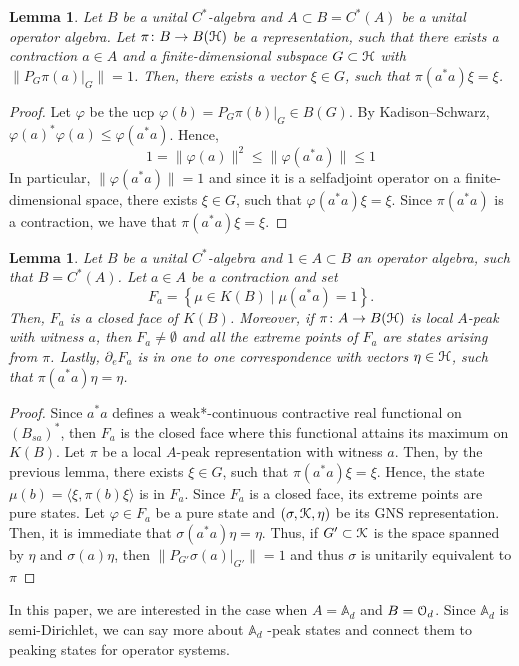 \documentclass{article}
\newtheorem{lem}[thm]{Lemma}
\theoremstyle{definition}
\theoremstyle{remark}
\numberwithin{equation}{section}
\newcommand{\cuntz}{\ensuremath{\cO_d}}
\def\A{\mathbb{A} _d}
\begin{document}
\begin{lem}
Let $B$ be a unital $C^*$-algebra and $A \subset B = C^*(A)$ be a unital operator algebra. Let $\pi \colon B \to B({\mathcal H})$ be a representation, such that there exists a contraction $a \in A$ and a finite-dimensional subspace $G \subset {\mathcal H}$ with $\|P_G \pi(a)|_G\| = 1$. Then, there exists a vector $\xi \in G$, such that $\pi(a^* a) \xi = \xi$.
\end{lem}
\begin{proof}
Let $\varphi$ be the ucp $\varphi(b) = P_G \pi(b)|_G \in B(G)$. By Kadison--Schwarz, $\varphi(a)^* \varphi(a) \leq \varphi(a^* a)$. Hence,
\[
1 = \|\varphi(a)\|^2 \leq \|\varphi(a^* a)\| \leq 1
\]
In particular, $\|\varphi(a^*a)\| = 1$ and since it is a selfadjoint operator on a finite-dimensional space, there exists $\xi \in G$, such that $\varphi(a^* a) \xi = \xi$. Since $\pi(a^* a)$ is a contraction, we have that $\pi(a^*a) \xi = \xi$.
\end{proof}

\begin{lem}
Let $B$ be a unital $C^*$-algebra and $1 \in A \subset B$ an operator algebra, such that $B = C^*(A)$. Let $a \in A$ be a contraction and set
\[
F_a = \left\{\mu \in K(B) \mid \mu(a^* a) = 1 \right\}.
\]
Then, $F_a$ is a closed face of $K(B)$. Moreover, if $\pi \colon A \to B({\mathcal H})$ is local $A$-peak with witness $a$, then $F_a \neq \emptyset$ and all the extreme points of $F_a$ are states arising from $\pi$. Lastly, $\partial_e F_a $ is in one to one correspondence with vectors $\eta \in {\mathcal H}$, such that $\pi(a^* a) \eta = \eta$.
\end{lem}
\begin{proof}
Since $a^* a$ defines a weak*-continuous contractive real functional on $(B_{sa})^*$, then $F_a$ is the closed face where this functional attains its maximum on $K(B)$. Let $\pi$ be a local $A$-peak representation with witness $a$. Then, by the previous lemma, there exists $\xi \in G$, such that $\pi(a^* a) \xi = \xi$. Hence, the state $\mu(b) = \langle  \xi, \pi(b) \xi \rangle$ is in $F_a$. Since $F_a$ is a closed face, its extreme points are pure states. Let $\varphi \in F_a$ be a pure state and $(\sigma, {\mathcal K}, \eta)$ be its GNS representation. Then, it is immediate that $\sigma(a^* a) \eta = \eta$. Thus, if $G' \subset {\mathcal K}$ is the space spanned by $\eta$ and $\sigma(a) \eta$, then $\|P_{G'} \sigma(a)|_{G'}\| = 1$ and thus $\sigma$ is unitarily equivalent to $\pi$
\end{proof}

In this paper, we are interested in the case when $A = \A$ and $B = \cuntz$. Since $ \A $ is semi-Dirichlet, we can say more about $ \A $ -peak states and connect them to peaking states for operator systems.
\end{document}
